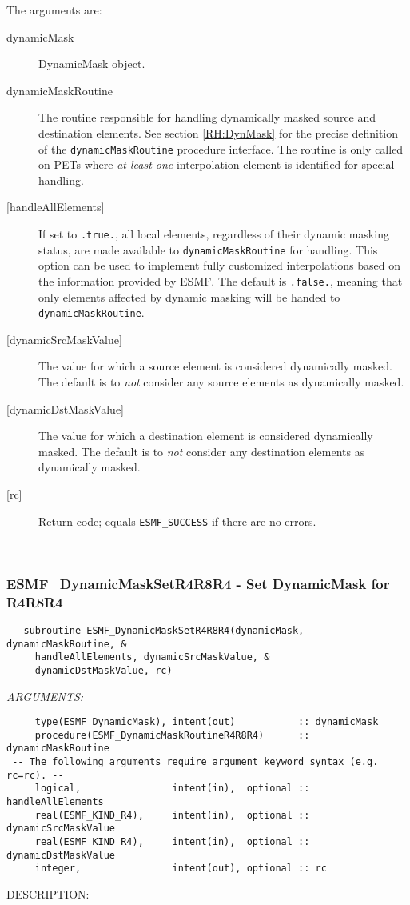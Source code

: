      The arguments are:
     \begin{description}
     \item[dynamicMask] 
       DynamicMask object.
     \item [dynamicMaskRoutine]
       The routine responsible for handling dynamically masked source and 
       destination elements. See section \ref{RH:DynMask} for the precise
       definition of the {\tt dynamicMaskRoutine} procedure interface.
       The routine is only called on PETs where {\em at least one} interpolation 
       element is identified for special handling.
     \item [{[handleAllElements]}]
       If set to {\tt .true.}, all local elements, regardless of their dynamic
       masking status, are made available to {\tt dynamicMaskRoutine} for
       handling. This option can be used to implement fully customized
       interpolations based on the information provided by ESMF.
       The default is {\tt .false.}, meaning that only elements affected by
       dynamic masking will be handed to {\tt dynamicMaskRoutine}.
     \item [{[dynamicSrcMaskValue]}]
       The value for which a source element is considered dynamically
       masked.
       The default is to {\em not} consider any source elements as
       dynamically masked.
     \item [{[dynamicDstMaskValue]}]
       The value for which a destination element is considered dynamically
       masked.
       The default is to {\em not} consider any destination elements as
       dynamically masked.
     \item[{[rc]}] 
       Return code; equals {\tt ESMF\_SUCCESS} if there are no errors.
     \end{description}
   
 
\mbox{}\hrulefill\ 
 
\subsubsection [ESMF\_DynamicMaskSetR4R8R4] {ESMF\_DynamicMaskSetR4R8R4 - Set DynamicMask for R4R8R4}


\begin{verbatim}   subroutine ESMF_DynamicMaskSetR4R8R4(dynamicMask, dynamicMaskRoutine, &
     handleAllElements, dynamicSrcMaskValue, &
     dynamicDstMaskValue, rc)\end{verbatim}{\em ARGUMENTS:}
\begin{verbatim}     type(ESMF_DynamicMask), intent(out)           :: dynamicMask
     procedure(ESMF_DynamicMaskRoutineR4R8R4)      :: dynamicMaskRoutine
 -- The following arguments require argument keyword syntax (e.g. rc=rc). --
     logical,                intent(in),  optional :: handleAllElements
     real(ESMF_KIND_R4),     intent(in),  optional :: dynamicSrcMaskValue
     real(ESMF_KIND_R4),     intent(in),  optional :: dynamicDstMaskValue
     integer,                intent(out), optional :: rc
           \end{verbatim}
{\sf DESCRIPTION:\\ }


